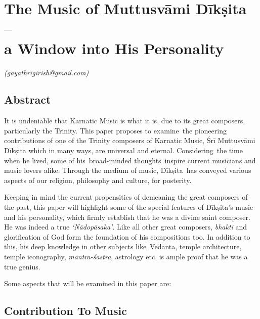 
\chapter{The Music of Muttusvāmi Dīkṣita –\\ a Window into His Personality}\label{chapter1}


\vspace{-.3cm}

\begin{flushright}
\textit{(gayathrigirish@gmail.com)}
\end{flushright}


\section*{Abstract}

It is undeniable that Karnatic Music is what it is, due to its great composers, particularly the Trinity. This paper proposes to examine the pioneering contributions of one of the Trinity composers of Karnatic Music, Śrī Muttusvāmi Dīkṣita which in many ways, are universal and eternal. Considering the time when he lived, some of his broad-minded thoughts inspire current musicians and music lovers alike. Through the medium of music, Dīkṣita has conveyed various aspects of our religion, philosophy and culture, for posterity.

Keeping in mind the current propensities of demeaning the great composers of the past, this paper will highlight some of the special features of Dīkṣita’s music and his personality, which firmly establish that he was a divine saint composer. He was indeed a true \textit{‘Nādopāsaka’}. Like all other great composers, \textit{bhakti} and glorification of God form the foundation of his compositions too. In addition to this, his deep knowledge in other subjects like Vedānta, temple architecture, temple iconography, \textit{mantra-śāstra}, astrology etc. is ample proof that he was a true genius. 

Some aspects that will be examined in this paper are:


\section*{Contribution To Music}


